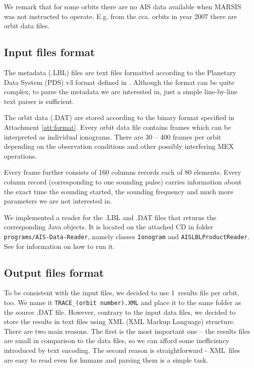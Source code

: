 We remark that for some orbits there are no AIS data available when MARSIS was not instructed to operate. E.g. from the cca.  orbits in year 2007 there are  orbit data files.

\subsection{Input files format}
The metadata (.LBL) files are text files formatted according to the Planetary Data System (PDS) v3 format defined in \citep{JPL2009}. Although the format can be quite complex, to parse the metadata we are interested in, just a simple line-by-line text parser is sufficient.

The orbit data (.DAT) are stored according to the binary format specified in Attachment \ref{att:format}. Every orbit data file contains frames which can be interpreted as individual ionograms. There are 30 -- 400 frames per orbit depending on the observation conditions and other possibly interfering MEX operations. 

Every frame further consists of 160 columns records each of 80 elements. Every column record (corresponding to one sounding pulse) carries information about the exact time the sounding started, the sounding frequency and much more parameters we are not interested in.

We implemented a reader for the .LBL and .DAT files that re\-turns the corresponding Java objects. It is located on the attached CD in folder \texttt{programs/AIS-Data-Reader}, namely classes \texttt{Ionogram} and \texttt{AISLBLProductReader}. See  for information on how to run it.

\subsection{Output files format}
To be consistent with the input files, we decided to use 1~results file per orbit, too. We name it \texttt{TRACE\_(orbit number).XML} and place it to the same folder as the source .DAT file. However, contrary to the input data files, we decided to store the results in text files using XML (XML Markup Language) structure. There are two main reasons. The first is the most important one -- the results files are small in comparison to the data files, so we can afford some inefficiency introduced by text encoding. The second reason is straightforward - XML~files are easy to read even for humans and parsing them is a simple task.

